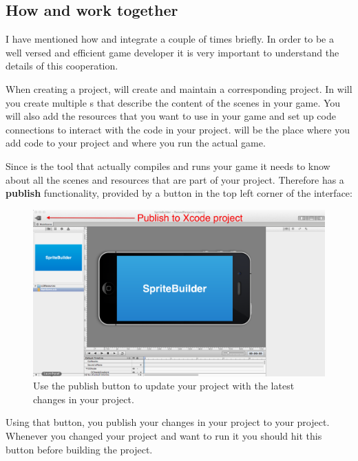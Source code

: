 \subsection{How \SB{} and \xcode{} work together}
\label{Publish}
I have mentioned how \SB{} and \xcode{} integrate a couple of times briefly. In
order to be a well versed and efficient \SB{} game developer it is very
important to understand the details of this cooperation.

When creating a \SB{} project, \SB{} will create and maintain a corresponding
\xcode{} project. In \SB{} will you create multiple \ccbfile{}s that describe
the content of the scenes in your game. You will also add the resources that
you want to use in your game and set up code connections to interact with the
code in your \xcode{} project. \xcode{} will be the place where you add code to
your project and where you run the actual game.

Since \xcode{} is the tool that actually compiles and runs your game it needs
to know about all the scenes and resources that are part of your \SB{} project.
Therefore \SB{} has a \textbf{publish} functionality, provided by
a button in the top left corner of the interface:
\begin{figure}[H]
		\centering
		\includegraphics[width=0.9\linewidth]{images/spritebuilder/spritebuilder_publish_button.png}
		\caption{Use the publish button to update your \xcode{} project with the
		latest changes in your \SB{} project.}
\end{figure}
Using that button, you publish your changes in your
\SB{} project to your \xcode{} project. Whenever you changed your \SB{}
project and want to run it you should hit this button before building the \xcode{}
project.


